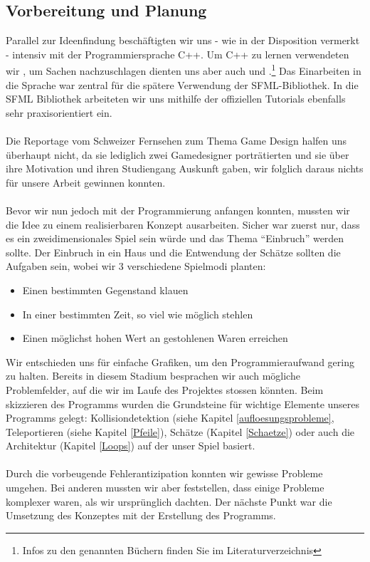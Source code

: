 \documentclass[11pt,a4paper]{scrbook}
\newcommand{\q}[1]{``#1''}
\begin{document}
\subsection{Vorbereitung und Planung}
Parallel zur Ideenfindung beschäftigten wir uns - wie in der
Disposition vermerkt - intensiv mit der Programmiersprache C++. Um C++ zu lernen verwendeten wir \cite{cpp_grundkurs}, um Sachen nachzuschlagen dienten uns aber auch \cite{cpp_referenz} und \cite{cpp_com}.\footnote{Infos zu den genannten Büchern finden Sie im Literaturverzeichnis} Das Einarbeiten in die Sprache war zentral für die spätere Verwendung der SFML-Bibliothek. In die SFML Bibliothek arbeiteten wir uns mithilfe der offiziellen Tutorials \cite{sfml_tutorials} ebenfalls sehr praxisorientiert ein.\\
\\
Die Reportage vom Schweizer Fernsehen \cite{sf_gamedesign} zum Thema Game Design halfen uns überhaupt nicht, da sie lediglich zwei Gamedesigner porträtierten und sie über ihre Motivation und ihren Studiengang Auskunft gaben, wir folglich daraus nichts für unsere Arbeit gewinnen konnten.\\
\\
Bevor wir nun jedoch mit der Programmierung anfangen konnten, mussten wir die Idee zu einem realisierbaren Konzept ausarbeiten.
Sicher war zuerst nur, dass es ein zweidimensionales Spiel sein würde und das Thema \q{Einbruch} werden sollte.
Der Einbruch in ein Haus und die Entwendung der Schätze sollten die Aufgaben sein, wobei wir 3 verschiedene Spielmodi planten:
\begin{itemize}
\item Einen bestimmten Gegenstand klauen
\item In einer bestimmten Zeit, so viel wie möglich stehlen
\item Einen möglichst hohen Wert an gestohlenen Waren erreichen
\end{itemize}
Wir entschieden uns für einfache Grafiken, um den Programmieraufwand gering zu halten. 
Bereits in diesem Stadium besprachen wir auch mögliche Problemfelder, auf die wir im Laufe des Projektes stossen könnten.
Beim skizzieren des Programms wurden die Grundsteine für wichtige Elemente unseres Programms gelegt: Kollisiondetektion (siehe Kapitel \ref{aufloesungsprobleme}, Teleportieren (siehe Kapitel \ref{Pfeile}), Schätze (Kapitel \ref{Schaetze}) oder auch die Architektur (Kapitel \ref{Loops}) auf der unser Spiel basiert.\\
\\
Durch die vorbeugende Fehlerantizipation konnten wir gewisse Probleme umgehen. Bei anderen mussten wir aber feststellen, dass einige Probleme komplexer waren, als wir ursprünglich dachten.
Der nächste Punkt war die Umsetzung des Konzeptes mit der Erstellung des Programms.
\end{document}
